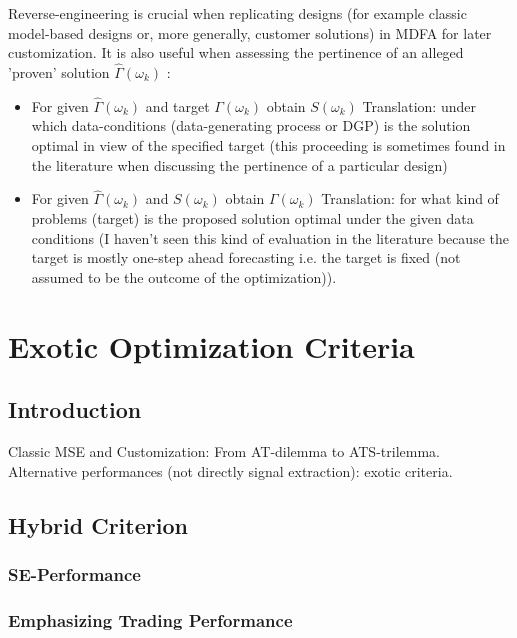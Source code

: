 \documentclass[a4paper]{book}
\begin{document}
Reverse-engineering is crucial when replicating designs (for example classic model-based designs or, more generally, customer solutions) in MDFA for later customization. It is also useful when assessing the pertinence of an alleged 'proven' solution $\hat{\Gamma}(\omega_k)$ :
\begin{itemize}
\item For given $\hat{\Gamma}(\omega_k)$ and target $\Gamma(\omega_k)$ obtain $S(\omega_k)$
        Translation: under which data-conditions (data-generating process or DGP) is the solution optimal in view of the specified target (this proceeding is sometimes found in the literature when discussing the pertinence of a particular design) 
\item For given $\hat{\Gamma}(\omega_k)$ and $S(\omega_k)$ obtain $\Gamma(\omega_k)$
        Translation: for what kind of problems (target) is the proposed solution optimal under the given data conditions (I haven't seen this kind of evaluation in the literature because the target is mostly one-step ahead forecasting i.e. the target is fixed (not assumed to be the outcome of the optimization)).
\end{itemize}






\chapter{Exotic Optimization Criteria}\label{exo_sec}

\section{Introduction}

Classic MSE and Customization: From AT-dilemma to ATS-trilemma. Alternative performances (not directly signal extraction): exotic criteria.


\section{Hybrid Criterion}

\subsection{SE-Performance}

\subsection{Emphasizing Trading Performance}
\end{document}
